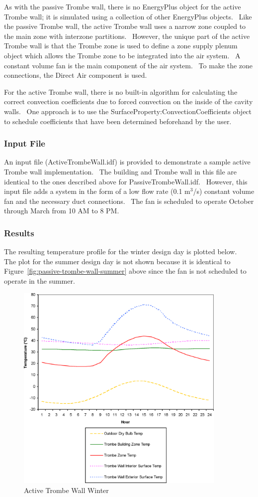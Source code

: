 As with the passive Trombe wall, there is no EnergyPlus object for the active Trombe wall; it is simulated using a collection of other EnergyPlus objects.~ Like the passive Trombe wall, the active Trombe wall uses a narrow zone coupled to the main zone with interzone partitions.~ However, the unique part of the active Trombe wall is that the Trombe zone is used to define a zone supply plenum object which allows the Trombe zone to be integrated into the air system.~ A constant volume fan is the main component of the air system.~ To make the zone connections, the Direct Air component is used.

For the active Trombe wall, there is no built-in algorithm for calculating the correct convection coefficients due to forced convection on the inside of the cavity walls.~ One approach is to use the SurfaceProperty:ConvectionCoefficients object to schedule coefficients that have been determined beforehand by the user.

\subsubsection{Input File}\label{input-file-1}

An input file (ActiveTrombeWall.idf) is provided to demonstrate a sample active Trombe wall implementation.~ The building and Trombe wall in this file are identical to the ones described above for PassiveTrombeWall.idf.~ However, this input file adds a system in the form of a low flow rate (0.1 m\(^{3}\)/s) constant volume fan and the necessary duct connections.~ The fan is scheduled to operate October through March from 10 AM to 8 PM.

\subsubsection{Results}\label{results-1}

The resulting temperature profile for the winter design day is plotted below.~ The plot for the summer design day is not shown because it is identical to Figure~\ref{fig:passive-trombe-wall-summer} above since the fan is not scheduled to operate in the summer.

\begin{figure}[hbtp] %
\centering
\includegraphics[width=0.9\textwidth, height=0.9\textheight, keepaspectratio=true]{media/image6833.png}
\caption{Active Trombe Wall Winter \protect \label{fig:active-trombe-wall-winter}}
\end{figure}
